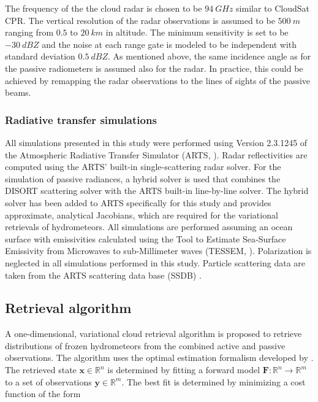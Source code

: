 \documentclass[journal abbreviation, manuscript]{copernicus}
\begin{document}
The frequency of the the cloud radar is chosen to be $94\ \unit{GHz}$ similar to
CloudSat CPR. The vertical resolution of the radar observations is assumed to be
$500\ \unit{m}$ ranging from $0.5$ to $20\ \unit{km}$ in altitude. The minimum
sensitivity is set to be $-30\ \unit{dBZ}$ and the noise at each range gate is
modeled to be independent with standard deviation $0.5\ \unit{dBZ}$. As mentioned
above, the same incidence angle as for the passive radiometers is assumed also
for the radar. In practice, this could be achieved by remapping the radar
observations to the lines of sights of the passive beams.

\subsubsection{Radiative transfer simulations}
\label{sec:orge741b86}

All simulations presented in this study were performed using Version 2.3.1245 of
the Atmospheric Radiative Transfer Simulator (ARTS, \cite{arts18}). Radar
reflectivities are computed using the ARTS' built-in single-scattering radar
solver. For the simulation of passive radiances, a hybrid solver is used that
combines the DISORT scattering solver with the ARTS built-in line-by-line
solver. The hybrid solver has been added to ARTS specifically for this study and
provides approximate, analytical Jacobians, which are required for the
variational retrievals of hydrometeors. All simulations are performed assuming
an ocean surface with emissivities calculated using the Tool to Estimate
Sea‐Surface Emissivity from Microwaves to sub‐Millimeter waves (TESSEM,
\cite{prigent16}). Polarization is neglected in all simulations performed in
this study. Particle scattering data are taken from the ARTS scattering data
base (SSDB) \citep{eriksson18}.

\subsection{Retrieval algorithm}
\label{sec:orgb528563}

A one-dimensional, variational cloud retrieval algorithm is proposed to
retrieve distributions of frozen hydrometeors from the combined active and
passive observations. The algorithm uses the optimal estimation formalism
developed by \cite{rodgers00}. The retrieved state $\mathbf{x} \in
   \mathbb{R}^n$ is determined by fitting a forward model $\mathbf{F} : \mathbb{R}^n
   \rightarrow \mathbb{R}^m$ to a set of observations $\mathbf{y} \in
   \mathbb{R}^m$. The best fit is determined by minimizing a cost function of
the form
\end{document}
